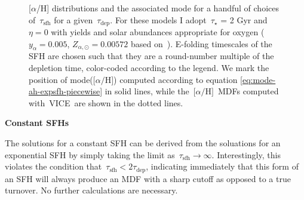 \documentclass[12pt]{article}
\newcommand{\ah}{\ensuremath{\text{[$\alpha$/H]}}}
\newcommand{\mh}{\ensuremath{\text{[M/H]}}}
\newcommand{\timescale}[1]{\ensuremath{\tau_\text{#1}}}
\newcommand{\vice}{\textsc{VICE}}
\begin{document}
\begin{figure}
\caption{
	[$\alpha$/H] distributions and the associated mode for a handful of choices
	of~$\timescale{sfh}$ for a given~$\timescale{dep}$.
	For these models I adopt~$\tau_\star$ = 2 Gyr and~$\eta = 0$ with
	yields and solar abundances appropriate for oxygen ($y_\alpha = 0.005$,
	$Z_{\alpha,\odot} = 0.00572$ based on~\citealt{Asplund2009}).
	E-folding timescales of the SFH are chosen such that they are a
	round-number multiple of the depletion time, color-coded according to the
	legend.
	We mark the position of mode(\ah) computed according to equation
	\ref{eq:mode-ah-expsfh-piecewise} in solid lines, while the~\ah~MDFs
	computed with~\vice~are shown in the dotted lines.
}
\label{fig:mode-ah-expsfh}
\end{figure}

\par\null\par\noindent
{\large \textbf{Constant SFHs}}
\par\noindent
The solutions for a constant SFH can be derived from the soluations for an
exponential SFH by simply taking the limit
as~$\timescale{sfh} \rightarrow \infty$.
Interestingly, this violates the condition that~$\timescale{sfh} <
2\timescale{dep}$, indicating immediately that this form of an SFH will always
produce an MDF with a sharp cutoff as opposed to a true turnover.
No further calculations are necessary.


\end{document}
